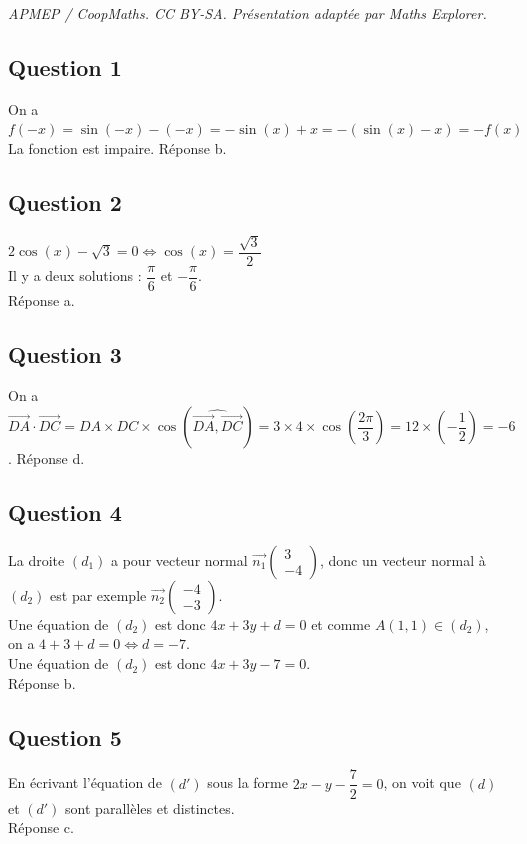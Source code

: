 \documentclass[10pt]{article}
\providecommand{\R}{\mathbb{R}}
\begin{document}
\noindent\textit{APMEP / CoopMaths. CC BY-SA. Présentation adaptée par Maths Explorer.}\par\medskip
\subsection*{Question 1}
	

	On a \(f(-x) = \sin(-x) - (-x) = -\sin(x) + x = -(\sin(x) - x) = -f(x)\)\\
	La fonction est impaire. Réponse b.
	
	\subsection*{Question 2}
	

	\(2\cos(x) - \sqrt{3} = 0 \iff \cos(x) = \dfrac{\sqrt{3}}{2}\) \\
	Il y a deux solutions : \(\dfrac{\pi}{6}\) et \(-\dfrac{\pi}{6}\).\\
	 Réponse a.
	
	\subsection*{Question 3}
	

	On a \(\overrightarrow{DA} \cdot \overrightarrow{DC} = DA \times DC \times \cos(\widehat{ \overrightarrow{DA}, \overrightarrow{DC}}) = 3 \times 4 \times \cos\left(\dfrac{2\pi}{3}\right) = 12 \times \left(-\dfrac{1}{2}\right) = -6\). Réponse d.
	
	\subsection*{Question 4}
	

	La droite \((d_1)\) a pour vecteur normal \(\overrightarrow{n_1}\begin{pmatrix}3\\ -4\end{pmatrix}\), donc un vecteur normal à \((d_2)\) est par exemple \(\overrightarrow{n_2}\begin{pmatrix}-4\\ -3\end{pmatrix}\).\\
	 Une équation de \((d_2)\) est donc \(4x + 3y + d = 0\) et comme \(A(1, 1) \in (d_2)\),\\ on a \(4 + 3 + d = 0 \iff d = -7\).\\ Une équation de \((d_2)\) est donc \(4x + 3y - 7 = 0\). \\Réponse b.
	
	\subsection*{Question 5}
	

	
	En écrivant l'équation de \((d')\) sous la forme \(2x - y - \dfrac{7}{2} = 0\), on voit que \((d)\) et \((d')\) sont parallèles et distinctes. \\
	Réponse c.
\end{document}
